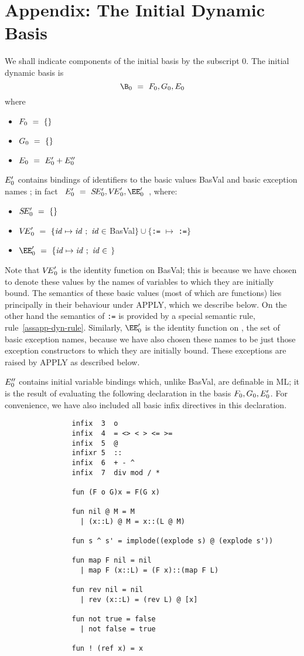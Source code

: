 \section{Appendix: The Initial Dynamic Basis}
\label{init-dyn-bas-app}
We shall indicate components of the initial basis by the subscript 0.
The initial dynamic basis is
\[ \B_0\ =\ \F_0,\G_0,\E_0\]
where
\begin{itemize}
\item $F_0\ =\ \{\}$
\item $G_0\ =\ \{\}$
\item $E_0\ =\ E_0'+E_0''$
\end{itemize}
$E_0'$ contains bindings of identifiers to the basic values BasVal and
basic exception names \BasExc; in fact
~$\E_0'\ =\ \SE_0',\VE_0',\EE_0'$~, where:
\begin{itemize}
\item $S\!E_0'\ =\ \{\}$
\item $\VE_0'\ =\ \{\id\mapsto\id\ ;\ \id\in$ BasVal$\}
                             \cup\{$\verb+:=+ $\mapsto$ \verb+:=+$\}$
\item $\EE_0'\ =\ \{\id\mapsto\id\ ;\ \id\in$ \BasExc$\}$
\end{itemize}
Note that $\mbox{$V\!E$}_0'$ is the identity function on BasVal; this is because
we have chosen to denote these values by the names of variables 
to which they are initially bound.
The semantics of these basic values (most of which are functions)
lies principally in their behaviour under APPLY, which we describe below.
On the other hand the semantics of \verb+:=+ is provided by a special
semantic rule, rule~\ref{assapp-dyn-rule}.
Similarly, $\EE_0'$ is the identity function on \BasExc, the set of
basic exception names, because we have also chosen
these names to be just those exception constructors to which they
are initially bound.
These exceptions are raised by APPLY as described below.

 $E_0''$ contains initial variable bindings which, unlike BasVal, are
 definable in ML; it is the result of evaluating
 the following declaration in the basis $F_0,G_0,E_0'$.  For convenience,
 we have also included all basic infix directives in this declaration.
 \begin{verbatim}
                infix  3  o
                infix  4  = <> < > <= >=
                infix  5  @
                infixr 5  ::
                infix  6  + - ^
                infix  7  div mod / *

                fun (F o G)x = F(G x)

                fun nil @ M = M
                  | (x::L) @ M = x::(L @ M)

                fun s ^ s' = implode((explode s) @ (explode s'))

                fun map F nil = nil
                  | map F (x::L) = (F x)::(map F L)

                fun rev nil = nil
                  | rev (x::L) = (rev L) @ [x]

                fun not true = false
                  | not false = true

                fun ! (ref x) = x
 \end{verbatim}

